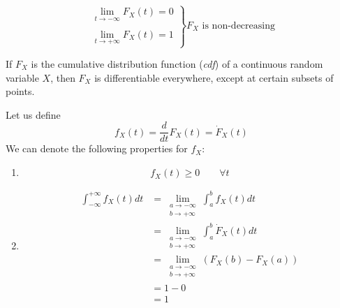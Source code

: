 \documentclass{article}
\begin{document}
\begin{defn}
		\begin{figure}[h]
			\begin{subfigure}{0.45\textwidth}
				\begin{center}
				\end{center}
				
			\end{subfigure}
			\hfill
			\begin{subfigure}{0.45\textwidth}
				$$ 
					\left.
					\begin{array}{c}
						\lim\limits_{t \to - \infty} F_X (t) = 0 \\
						\\
						\lim\limits_{t \to + \infty} F_X (t) = 1 
					\end{array}
					\right\}
					F_X \text{ is non-decreasing}
				$$
			\end{subfigure}
		\end{figure}
	\end{defn}
	\begin{prop}
		If $F_X$ is the cumulative distribution function (\emph{cdf}) of a continuous random variable $X$, then $F_X$ is differentiable everywhere, except at certain subsets of points.
	\end{prop}
	Let us define
	$$ 
		f_X (t) = \frac{d}{dt} F_X (t) = \dot{F}_X (t)
	$$
	We can denote the following properties for $f_X$:
	\begin{enumerate}
		\item$$f_X (t) \geq 0 \quad \quad \forall t$$
		\item \begin{align*}
			\int_{-\infty}^{+\infty} f_X (t) dt &= \lim_{\substack{a \to - \infty \\  b \to + \infty}} \int_a^b f_X (t)dt \\
			&= \lim_{\substack{a \to - \infty \\  b \to + \infty}} \int_a^b \dot{F}_X (t)dt \\
			&= \lim_{\substack{a \to - \infty \\  b \to + \infty}} \left( F_X (b) -  F_X (a) \right) \\
			&= 1-0 \\
			&= 1
		\end{align*}
	\end{enumerate}
\end{document}
